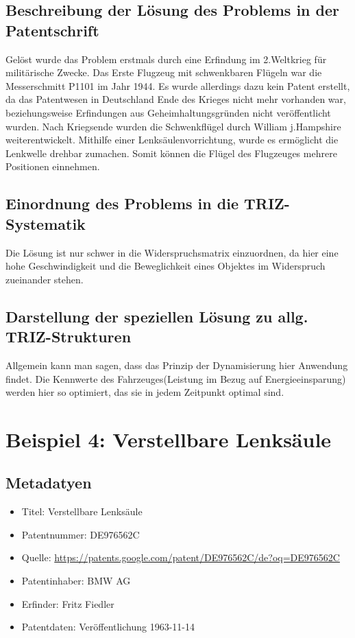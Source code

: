 \documentclass{article}
\begin{document}
\subsection{Beschreibung der Lösung des Problems in der Patentschrift}
Gelöst wurde das Problem erstmals durch eine Erfindung im 2.Weltkrieg für militärische Zwecke. Das Erste Flugzeug mit schwenkbaren Flügeln war die Messerschmitt P1101 im Jahr 1944.                                                             Es wurde allerdings dazu kein Patent erstellt, da das Patentwesen in Deutschland Ende des Krieges nicht mehr vorhanden war, beziehungsweise Erfindungen aus Geheimhaltungsgründen nicht veröffentlicht wurden. Nach Kriegsende wurden die Schwenkflügel durch William j.Hampshire weiterentwickelt. Mithilfe einer Lenksäulenvorrichtung, wurde es ermöglicht die Lenkwelle drehbar zumachen. Somit können die Flügel des Flugzeuges mehrere Positionen einnehmen.  
\subsection{Einordnung des Problems in die TRIZ-Systematik}
Die Lösung ist nur schwer in die Widerspruchsmatrix einzuordnen, da hier eine hohe Geschwindigkeit und die Beweglichkeit eines Objektes im Widerspruch zueinander stehen.
\subsection{Darstellung der speziellen Lösung zu allg. TRIZ-Strukturen}
Allgemein kann man sagen, dass das Prinzip der Dynamisierung hier Anwendung findet. Die Kennwerte des Fahrzeuges(Leistung im Bezug auf Energieeinsparung) werden hier so optimiert, das sie in jedem Zeitpunkt optimal sind.
\section{Beispiel 4: Verstellbare Lenksäule}
\subsection{Metadatyen}
\begin{itemize}\itemsep0pt
\item Titel: Verstellbare Lenksäule
\item Patentnummer: DE976562C
\item Quelle: \url{https://patents.google.com/patent/DE976562C/de?oq=DE976562C}
\item Patentinhaber: BMW AG 
\item Erfinder: Fritz Fiedler 
\item Patentdaten: Veröffentlichung 1963-11-14
\end{itemize}
\end{document}
